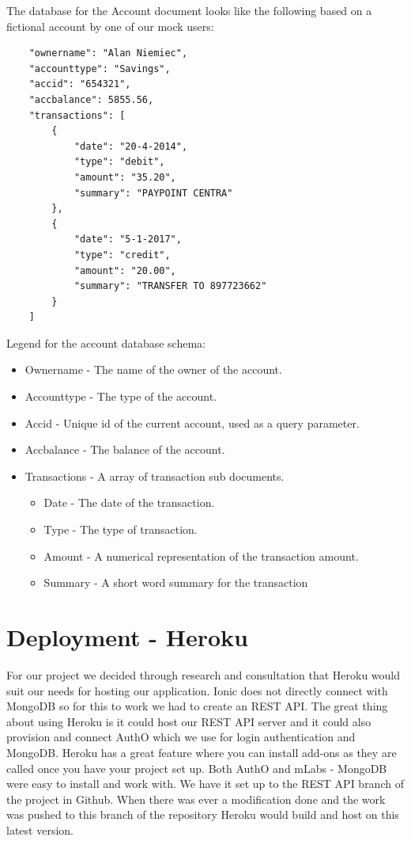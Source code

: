 The database for the Account document looks like the following based on a fictional account by one of our mock users:
\begin{verbatim}
    "ownername": "Alan Niemiec",
    "accounttype": "Savings",
    "accid": "654321",
    "accbalance": 5855.56,
    "transactions": [
        {
            "date": "20-4-2014",
            "type": "debit",
            "amount": "35.20",
            "summary": "PAYPOINT CENTRA"
        },
        {
            "date": "5-1-2017",
            "type": "credit",
            "amount": "20.00",
            "summary": "TRANSFER TO 897723662"
        }
    ]
\end{verbatim}

Legend for the account database schema:
\begin{itemize}
    \item Ownername - The name of the owner of the account.
    \item Accounttype - The type of the account.
    \item Accid - Unique id of the current account, used as a query parameter.
    \item Accbalance - The balance of the account.
    \item Transactions - A array of transaction sub documents.
        \begin{itemize}
            \item Date - The date of the transaction.
            \item Type - The type of transaction.
            \item Amount - A numerical representation of the transaction amount.
            \item Summary - A short word summary for the transaction
        \end{itemize}
\end{itemize}



\paragraph{}
\section{Deployment - Heroku}
For our project we decided through research and consultation that Heroku would suit our needs for hosting our application. Ionic does not directly connect with MongoDB so for this to work we had to create an REST API. The great thing about using Heroku is it could host our REST API server and it could also provision and connect AuthO which we use for login authentication and MongoDB. Heroku has a great feature where you can install add-ons as they are called once you have your project set up. Both AuthO and mLabs - MongoDB were easy to install and work with. We have it set up to the REST API branch of the project in Github. When there was ever a modification done and the work was pushed to this branch of the repository Heroku would build and host on this latest version.





